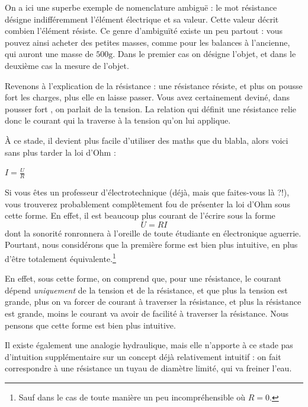 \documentclass{article}
\newcommand{\inc}{\fontfamily{cmr}\selectfont\textperiodcentered}
\begin{document}
On a ici une superbe exemple de nomenclature ambiguë : le mot résistance désigne indifféremment l'élément électrique et sa valeur. Cette valeur décrit combien l'élément résiste. Ce genre d'ambiguïté existe un peu partout : vous pouvez ainsi acheter des petites masses, comme pour les balances à l'ancienne, qui auront une masse de $500\si{\gram}$. Dans le premier cas on désigne l'objet, et dans le deuxième cas la mesure de l'objet.

Revenons à l'explication de la résistance : une résistance résiste, et plus on pousse fort les charges, plus elle en laisse passer. Vous avez certainement deviné, dans \og pousser fort \fg{}, on parlait de la tension. La relation qui définit une résistance relie donc le courant qui la traverse à la tension qu'on lui applique. 

À ce stade, il devient plus facile d'utiliser des maths que du blabla, alors voici sans plus tarder la loi d'Ohm :

\begin{tcolorbox}
\centering \Large $\displaystyle I = \frac{U}{R}$
\end{tcolorbox}

Si vous êtes un professeur d'électrotechnique (déjà, mais que faites-vous là ?!), vous trouverez probablement complètement fou de présenter la loi d'Ohm sous cette forme. En effet, il est beaucoup plus courant de l'écrire sous la forme
\[ U=RI \]
dont la sonorité ronronnera à l'oreille de tout\inc{}e étudiant\inc{}e en électronique aguerri\inc{}e. Pourtant, nous considérons que la première forme est bien plus intuitive, en plus d'être totalement équivalente.\footnote{Sauf dans le cas de toute manière un peu incompréhensible où $R=0$.}

En effet, sous cette forme, on comprend que, pour une résistance, le courant dépend \emph{uniquement} de la tension et de la résistance, et que plus la tension est grande, plus on va forcer de courant à traverser la résistance, et plus la résistance est grande, moins le courant va avoir de facilité à traverser la résistance. Nous pensons que cette forme est bien plus intuitive.

Il existe également une analogie hydraulique, mais elle n'apporte à ce stade pas d'intuition supplémentaire sur un concept déjà relativement intuitif : on fait correspondre à une résistance un tuyau de diamètre limité, qui va freiner l'eau.
\end{document}
